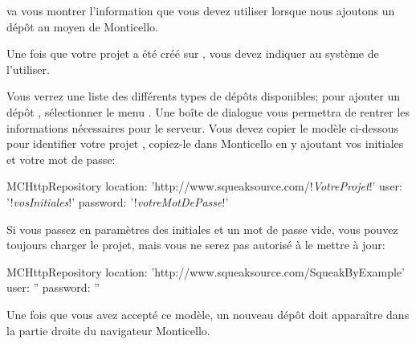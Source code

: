 \documentclass[a4paper,10pt,twoside]{book}
\begin{document}
\sqsrc va vous montrer l'information que vous devez utiliser
lorsque nous ajoutons un dépôt au moyen de Monticello.

Une fois que votre projet a été créé sur \sqsrc, vous devez indiquer au système \pharo de l'utiliser.

  Vous
verrez une liste des différents types de dépôts disponibles; pour
ajouter un dépôt \sqsrc, sélectionner le menu . Une
boîte de dialogue vous permettra de rentrer les informations
nécessaires pour le serveur.
Vous devez copier le modèle ci-dessous pour identifier votre projet
\sqsrc, copiez-le dans Monticello en y ajoutant vos initiales
et votre mot de passe:

\begin{code}{}
MCHttpRepository 
    location: 'http://www.squeaksource.com/!\emph{VotreProjet}!'
    user: '!\emph{vosInitiales}!' 
    password: '!\emph{votreMotDePasse}!'
\end{code}   

\noindent
Si vous passez en paramètres des initiales et un mot de passe vide,
vous pouvez toujours charger le projet, mais vous ne serez pas
autorisé à le mettre à jour:

\begin{code}{}
MCHttpRepository 
    location: 'http://www.squeaksource.com/SqueakByExample'
    user: '' 
    password: ''
\end{code}   

Une fois que vous avez accepté ce modèle, un nouveau dépôt doit
apparaître dans la partie droite du navigateur Monticello.
\end{document}
